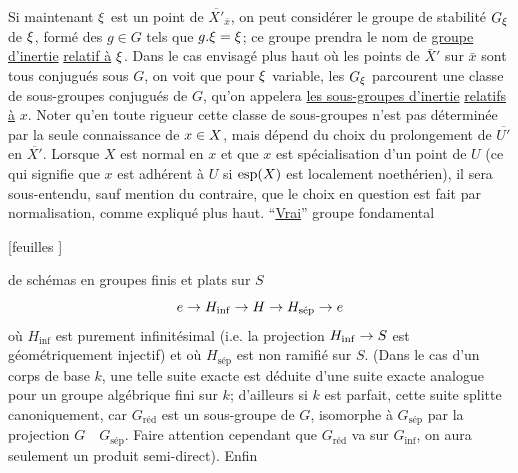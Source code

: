 Si maintenant  $\xi$ est un point de $\overline{X'}_{\bar x}$, on peut considérer le
groupe de stabilité $G_{\xi}$ de $\xi$, formé des $g\in G$ tels que $g.\xi=\xi$; ce groupe
prendra le nom de \uline{groupe d'inertie} \uline{relatif à} $\xi$. Dans le cas envisagé plus
haut où les points de $\bar X'$ sur $\bar x$ sont tous conjugués sous $G$, on voit que
pour $\xi$ variable, les $G_{\xi}$ parcourent une classe de sous-groupes conjugués
de $G$, qu'on appelera  \uline{les sous-groupes d'inertie}  \uline{relatifs à} $x$. Noter
qu'en toute rigueur cette classe de sous-groupes  n'est pas
déterminée par la seule connaissance de $x\in X$, mais dépend du choix du
prolongement de $\overline{U'}$ en $\overline{X'}$. Lorsque $X$ est normal en $x$ et que $x$ est spécialisation d'un point de $U$ (ce qui signifie que $x$ est adhérent à $U$ si $\mathrm{esp}(X)$
est localement noethérien), il sera sous-entendu, \deleted{\unsure{-}}sauf mention du contraire, que le choix en question est fait par normalisation, comme expliqué
plus haut.
``\uline{Vrai}'' groupe fondamental

[feuilles ]

de schémas en groupes finis et plats sur $S$
\[
e\to H_{\mathrm{inf}}\to H\to H_{\text{sép}}\to e
\]
où $H_{\mathrm{inf}}$ est purement infinitésimal (i.e. la projection $H_{\mathrm{inf}}\to S$
est géométriquement injectif) et où $H_{\text{sép}}$ est non ramifié sur $S$.
(Dans le cas d'un corps de base $k$, une telle suite exacte est
déduite d'une suite exacte analogue pour un groupe algébrique
fini  sur $k$; d'ailleurs si $k$ est parfait, cette suite splitte canoniquement, car $G_{\text{réd}}$ est  un sous-groupe de $G$, isomorphe à $G_{\text{sép}}$ par la
projection $G\quad G_{\text{sép}}$. Faire attention cependant que $G_{\text{réd}}$ va 
sur $G_{\mathrm{inf}}$, on aura seulement un produit semi-direct). Enfin

